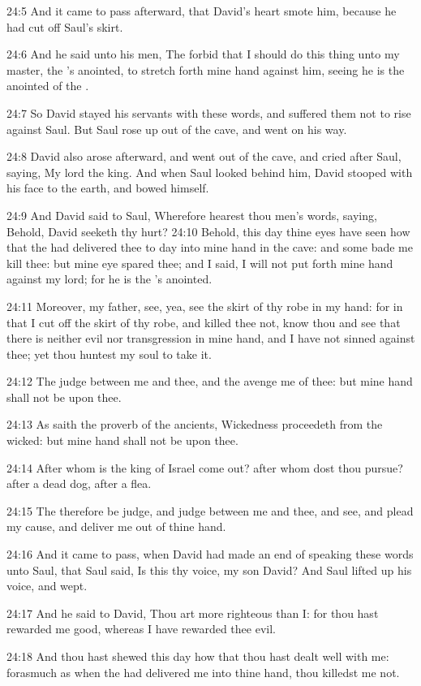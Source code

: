 24:5 And it came to pass afterward, that David's heart smote him,
because he had cut off Saul's skirt.

24:6 And he said unto his men, The \LORD forbid that I should do this
thing unto my master, the \LORD's anointed, to stretch forth mine hand
against him, seeing he is the anointed of the \LORD.

24:7 So David stayed his servants with these words, and suffered them
not to rise against Saul. But Saul rose up out of the cave, and went
on his way.

24:8 David also arose afterward, and went out of the cave, and cried
after Saul, saying, My lord the king. And when Saul looked behind him,
David stooped with his face to the earth, and bowed himself.

24:9 And David said to Saul, Wherefore hearest thou men's words,
saying, Behold, David seeketh thy hurt?  24:10 Behold, this day thine
eyes have seen how that the \LORD had delivered thee to day into mine
hand in the cave: and some bade me kill thee: but mine eye spared
thee; and I said, I will not put forth mine hand against my lord; for
he is the \LORD's anointed.

24:11 Moreover, my father, see, yea, see the skirt of thy robe in my
hand: for in that I cut off the skirt of thy robe, and killed thee
not, know thou and see that there is neither evil nor transgression in
mine hand, and I have not sinned against thee; yet thou huntest my
soul to take it.

24:12 The \LORD judge between me and thee, and the \LORD avenge me of
thee: but mine hand shall not be upon thee.

24:13 As saith the proverb of the ancients, Wickedness proceedeth from
the wicked: but mine hand shall not be upon thee.

24:14 After whom is the king of Israel come out? after whom dost thou
pursue? after a dead dog, after a flea.

24:15 The \LORD therefore be judge, and judge between me and thee, and
see, and plead my cause, and deliver me out of thine hand.

24:16 And it came to pass, when David had made an end of speaking
these words unto Saul, that Saul said, Is this thy voice, my son
David? And Saul lifted up his voice, and wept.

24:17 And he said to David, Thou art more righteous than I: for thou
hast rewarded me good, whereas I have rewarded thee evil.

24:18 And thou hast shewed this day how that thou hast dealt well with
me: forasmuch as when the \LORD had delivered me into thine hand, thou
killedst me not.

